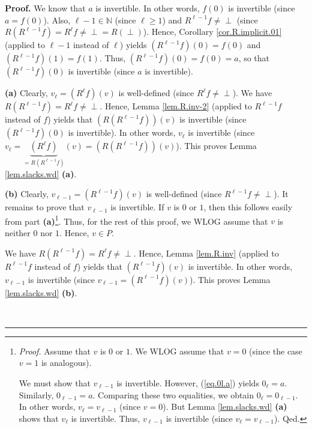 \documentclass[numbers=enddot,12pt,final,onecolumn,notitlepage]{scrartcl}%
\theoremstyle{definition}
\newenvironment{verlong}{}{}
\newcommand{\undf}{\operatorname*{\bot}}
\newenvironment{proof}[1][Proof]{\noindent\textbf{#1.} }{\ \rule{0.5em}{0.5em}}
\begin{document}
\begin{verlong}


\begin{proof}
We know that $a$ is invertible. In other words, $f\left(  0\right)  $ is
invertible (since $a=f\left(  0\right)  $). Also, $\ell-1\in\mathbb{N}$ (since
$\ell\geq1$) and $R^{\ell-1}f\neq\undf$ (since $R\left(  R^{\ell-1}f\right)
=R^{\ell}f\neq\undf=R\left(  \undf\right)  $). Hence, Corollary
\ref{cor.R.implicit.01} (applied to $\ell-1$ instead of $\ell$) yields
$\left(  R^{\ell-1}f\right)  \left(  0\right)  =f\left(  0\right)  $ and
$\left(  R^{\ell-1}f\right)  \left(  1\right)  =f\left(  1\right)  $. Thus,
$\left(  R^{\ell-1}f\right)  \left(  0\right)  =f\left(  0\right)  =a$, so
that $\left(  R^{\ell-1}f\right)  \left(  0\right)  $ is invertible (since $a$
is invertible). \medskip

\textbf{(a)} Clearly, $v_{\ell}=\left(  R^{\ell}f\right)  \left(  v\right)  $
is well-defined (since $R^{\ell}f\neq\undf$). We have $R\left(  R^{\ell
-1}f\right)  =R^{\ell}f\neq\undf$. Hence, Lemma \ref{lem.R.inv-2} (applied to
$R^{\ell-1}f$ instead of $f$) yields that $\left(  R\left(  R^{\ell
-1}f\right)  \right)  \left(  v\right)  $ is invertible (since $\left(
R^{\ell-1}f\right)  \left(  0\right)  $ is invertible). In other words,
$v_{\ell}$ is invertible (since $v_{\ell}=\underbrace{\left(  R^{\ell
}f\right)  }_{=R\left(  R^{\ell-1}f\right)  }\left(  v\right)  =\left(
R\left(  R^{\ell-1}f\right)  \right)  \left(  v\right)  $). This proves Lemma
\ref{lem.slacks.wd} \textbf{(a)}. \medskip

\textbf{(b)} Clearly, $v_{\ell-1}=\left(  R^{\ell-1}f\right)  \left(
v\right)  $ is well-defined (since $R^{\ell-1}f\neq\undf$). It remains to
prove that $v_{\ell-1}$ is invertible. If $v$ is $0$ or $1$, then this follows
easily from part \textbf{(a)}\footnote{\textit{Proof.} Assume that $v$ is $0$
or $1$. We WLOG assume that $v=0$ (since the case $v=1$ is analogous).
\par
We must show that $v_{\ell-1}$ is invertible. However, (\ref{eq.0l.a}) yields
$0_{\ell}=a$. Similarly, $0_{\ell-1}=a$. Comparing these two equalities, we
obtain $0_{\ell}=0_{\ell-1}$. In other words, $v_{\ell}=v_{\ell-1}$ (since
$v=0$). But Lemma \ref{lem.slacks.wd} \textbf{(a)} shows that $v_{\ell}$ is
invertible. Thus, $v_{\ell-1}$ is invertible (since $v_{\ell}=v_{\ell-1}$).
Qed.}. Thus, for the rest of this proof, we WLOG assume that $v$ is neither
$0$ nor $1$. Hence, $v\in P$.

We have $R\left(  R^{\ell-1}f\right)  =R^{\ell}f\neq\undf$. Hence, Lemma
\ref{lem.R.inv} (applied to $R^{\ell-1}f$ instead of $f$) yields that $\left(
R^{\ell-1}f\right)  \left(  v\right)  $ is invertible. In other words,
$v_{\ell-1}$ is invertible (since $v_{\ell-1}=\left(  R^{\ell-1}f\right)
\left(  v\right)  $). This proves Lemma \ref{lem.slacks.wd} \textbf{(b)}.
\medskip


\end{proof}
\end{verlong}
\end{document}
